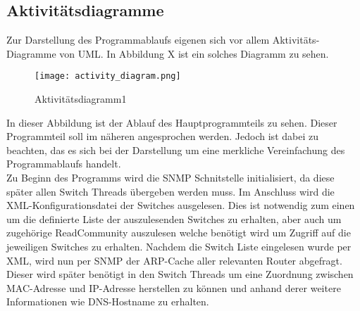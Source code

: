 \subsection{Aktivitätsdiagramme}
\label{subsec:acitvitydiagrams}

Zur Darstellung des Programmablaufs eigenen sich vor allem Aktivitäts-Diagramme von UML.
In Abbildung X ist ein solches Diagramm zu sehen.\\

\begin{figure}[H]
\centering
\texttt{[image: activity\_diagram.png]}
\caption{Aktivitätsdiagramm1}
\label{fig:activitydiagram1}
\end{figure}

In dieser Abbildung ist der Ablauf des Hauptprogrammteils zu sehen. Dieser Programmteil soll im näheren angesprochen werden. Jedoch ist dabei zu beachten, das es sich bei der Darstellung um eine merkliche Vereinfachung des Programmablaufs handelt.\\
Zu Beginn des Programms wird die SNMP Schnitstelle initialisiert, da diese später allen Switch Threads übergeben werden muss. Im Anschluss wird die XML-Konfigurationsdatei der Switches ausgelesen. Dies ist notwendig zum einen um die definierte Liste der auszulesenden Switches zu erhalten, aber auch um zugehörige ReadCommunity auszulesen welche benötigt wird um Zugriff auf die jeweiligen Switches zu erhalten. Nachdem die Switch Liste eingelesen wurde per XML, wird nun per SNMP der ARP-Cache aller relevanten Router abgefragt. Dieser wird später benötigt in den Switch Threads um eine Zuordnung zwischen MAC-Adresse und IP-Adresse herstellen zu können und anhand derer weitere Informationen wie DNS-Hostname zu erhalten.
